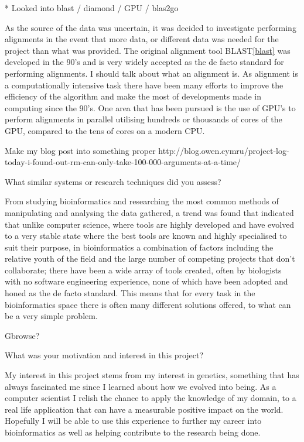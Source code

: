 * Looked into blast / diamond / GPU / blas2go

As the source of the data was uncertain, it was decided to investigate performing alignments in the event that more data, or different data was needed for the project than what was provided. The original alignment tool BLAST\ref{blast} was developed in the 90's and is very widely accepted as the de facto standard for performing alignments. I should talk about what an alignment is. As alignment is a computationally intensive task there have been many efforts to improve the efficiency of the algorithm and make the most of developments made in computing since the 90's. One area that has been pursued is the use of GPU's to perform alignments in parallel utilising hundreds or thousands of cores of the GPU, compared to the tens of cores on a modern CPU. 

Make my blog post into something proper http://blog.owen.cymru/project-log-today-i-found-out-rm-can-only-take-100-000-arguments-at-a-time/

What similar systems or research techniques did you assess? 

From studying bioinformatics and researching the most common methods of manipulating and analysing the data gathered, a trend was found that indicated that unlike computer science, where tools are highly developed and have evolved to a very stable state where the best tools are known and highly specialised to suit their purpose, in bioinformatics a combination of factors including the relative youth of the field and the large number of competing projects that don't collaborate; there have been a wide array of tools created, often by biologists with no software engineering experience, none of which have been adopted and honed as the de facto standard. This means that for every task in the bioinformatics space there is often many different solutions offered, to what can be a very simple problem. 

Gbrowse?

What was your motivation and interest in this project? 

My interest in this project stems from my interest in genetics, something that has always fascinated me since I learned about how we evolved into being. As a computer scientist I relish the chance to apply the knowledge of my domain, to a real life application that can have a measurable positive impact on the world. Hopefully I will be able to use this experience to further my career into bioinformatics as well as helping contribute to the research being done. 

